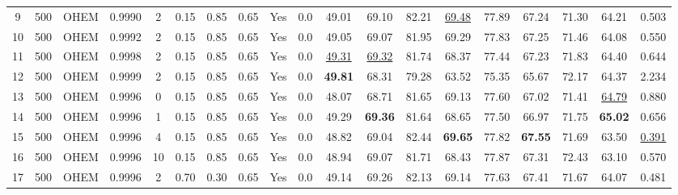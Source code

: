 \documentclass{article}
\begin{document}
\begin{table*}
{\begin{tabular}{c|ccccccccc|ccc|ccccc|c}
    \noalign{\smallskip}
    \hline
    \noalign{\smallskip}
    
    9 & 500 & OHEM & 0.9990 & 2 & 0.15 & 0.85 & 0.65 & Yes & 0.0
    & 49.01  & 69.10  & 82.21  
    & \underline{69.48}  & 77.89  & 67.24  
    & 71.30  & 64.21  & 0.503 \\
    
    10 & 500 & OHEM & 0.9992 & 2 & 0.15 & 0.85 & 0.65 & Yes & 0.0
    & 49.05  & 69.07  & 81.95  
    & 69.29  & 77.83  & 67.25  
    & 71.46  & 64.08  & 0.550 \\
    
    11 & 500 & OHEM & 0.9998 & 2 & 0.15 & 0.85 & 0.65 & Yes & 0.0
    & \underline{49.31}  & \underline{69.32}  & 81.74  
    & 68.37  & 77.44  & 67.23  
    & 71.83  & 64.40  & 0.644 \\
    
    12 & 500 & OHEM & 0.9999 & 2 & 0.15 & 0.85 & 0.65 & Yes & 0.0
    & \textbf{49.81}  & 68.31  & 79.28  
    & 63.52  & 75.35  & 65.67  
    & 72.17  & 64.37  & 2.234 \\
    
    \noalign{\smallskip}
    \hline
    \noalign{\smallskip}
    
    13 & 500 & OHEM & 0.9996 & 0 & 0.15 & 0.85 & 0.65 & Yes & 0.0
    & 48.07  & 68.71  & 81.65  
    & 69.13  & 77.60  & 67.02 
    & 71.41  & \underline{64.79}  & 0.880 \\
    
    14 & 500 & OHEM & 0.9996 & 1 & 0.15 & 0.85 & 0.65 & Yes & 0.0
    & {49.29}  & \textbf{69.36}  & 81.64  
    & 68.65  & 77.50  & 66.97 
    & 71.75  & \textbf{65.02}  & 0.656 \\
    
    15 & 500 & OHEM & 0.9996 & 4 & 0.15 & 0.85 & 0.65 & Yes & 0.0
    & 48.82  & 69.04  &  82.44
    & \textbf{69.65}  & 77.82  & \textbf{67.55} 
    & 71.69  & 63.50  & \underline{0.391} \\
    
    16 & 500 & OHEM & 0.9996 & 10 & 0.15 & 0.85 & 0.65 & Yes & 0.0
    & 48.94  & 69.07  & 81.71  
    & 68.43  & 77.87  & 67.31
    & {72.43}  & 63.10  & 0.570 \\
    
    \noalign{\smallskip}
    \hline
    \noalign{\smallskip}
    
    17 & 500 & OHEM & 0.9996 & 2 & 0.70 & 0.30 & 0.65 & Yes & 0.0
    & 49.14 & 69.26 & 82.13 & 69.14 & 77.63 & {67.41} & 71.67 & 64.07 & 0.481 \\
    

\end{tabular}}
\end{table*}
\end{document}
